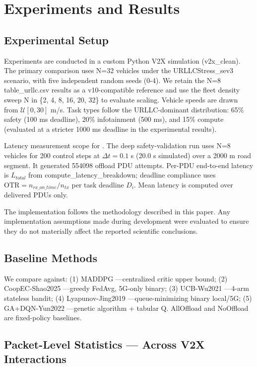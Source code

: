 \section{Experiments and Results}

\subsection{Experimental Setup}

Experiments are conducted in a custom Python V2X simulation (v2x\_clean). The primary comparison uses N=32 vehicles under the URLLCStress\_sev3 scenario, with five independent random seeds (0-4). We retain the N=8 table\_urllc.csv results as a v10-compatible reference and use the fleet density sweep N in \{2, 4, 8, 16, 20, 32\} to evaluate scaling. Vehicle speeds are drawn from $\mathcal{U}[0, 30]$ m/s. Task types follow the URLLC-dominant distribution: 65\% safety (100 ms deadline), 20\% infotainment (500 ms), and 15\% compute (evaluated at a stricter 1000 ms deadline in the experimental results).

Latency measurement scope for . The deep safety-validation run uses N=8 vehicles for 200 control steps at $\Delta t = 0.1$ s (20.0 s simulated) over a 2000 m road segment. It generated 554098 offload PDU attempts. Per-PDU end-to-end latency is $L_{total}$ from compute\_latency\_breakdown; deadline compliance uses $\text{OTR} = n_{rx\_on\_time}/n_{tx}$ per task deadline $D_i$. Mean latency is computed over delivered PDUs only.

The implementation follows the methodology described in this paper. Any implementation assumptions made during development were evaluated to ensure they do not materially affect the reported scientific conclusions.

\subsection{Baseline Methods}

We compare against: (1) MADDPG \cite{7}---centralized critic upper bound; (2) CoopEC-Shao2025 \cite{3}---greedy FedAvg, 5G-only binary; (3) UCB-Wu2021 \cite{4}---4-arm stateless bandit; (4) Lyapunov-Jing2019 \cite{5}---queue-minimizing binary local/5G; (5) GA+DQN-Yun2022 \cite{6}---genetic algorithm + tabular Q. AllOffload and NoOffload are fixed-policy baselines.

\subsection{Packet-Level Statistics --- Across V2X Interactions}

